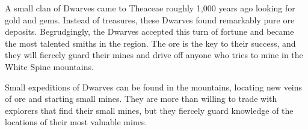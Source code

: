 A small clan of Dwarves came to Theaceae roughly 1,000 years ago looking for gold and gems.
Instead of treasures, these Dwarves found remarkably pure ore deposits.
Begrudgingly, the Dwarves accepted this turn of fortune and became the most talented smiths in the region.
The ore is the key to their success, and they will fiercely guard their mines and drive off anyone who tries to mine in the White Spine mountains.

Small expeditions of Dwarves can be found in the mountains, locating new veins of ore and starting small mines.
They are more than willing to trade with explorers that find their small mines, but they fiercely guard knowledge of the locations of their most valuable mines.
